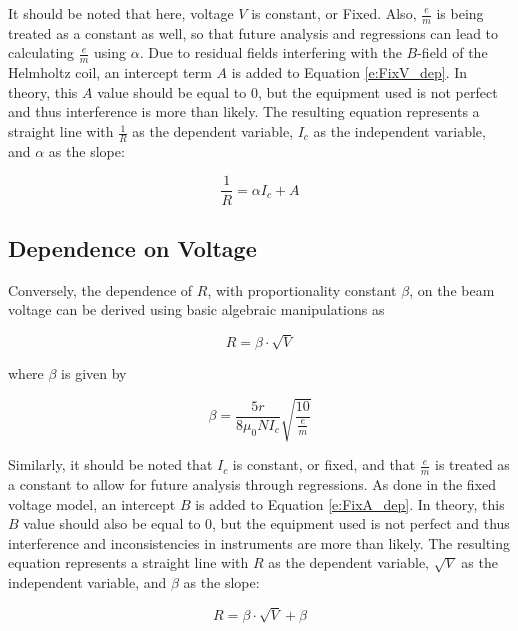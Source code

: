 \documentclass[12pt]{article}
\begin{document}
\noindent It should be noted that here, voltage $V$ is constant, or Fixed. Also, $\frac{e}{m}$ is being treated as a constant as well, so that future analysis and regressions can lead to calculating $\frac{e}{m}$ using $\alpha$. Due to residual fields interfering with the $B$-field of the Helmholtz coil, an intercept term $A$ is added to Equation \ref{e:FixV_dep}. In theory, this $A$ value should be equal to 0, but the equipment used is not perfect and thus interference is more than likely. The resulting equation represents a straight line with $\frac{1}{R}$ as the dependent variable, $I_c$ as the independent variable, and $\alpha$ as the slope:

\begin{equation}
	\frac{1}{R}=\alpha I_c + A \label{e:FixV_linear}
\end{equation}

\subsection{Dependence on Voltage}

Conversely, the dependence of $R$, with proportionality constant $\beta$, on the beam voltage can be derived using basic algebraic manipulations as

\begin{equation}
	R=\beta\cdot\sqrt{V} \label{e:FixA_dep}
\end{equation}

\noindent where $\beta$ is given by

\begin{equation}
	\beta=\frac{5r}{8\mu_0NI_c}\sqrt{\frac{10}{\frac{e}{m}}} \label{e:FixA_beta}
\end{equation}

\noindent Similarly, it should be noted that $I_c$ is constant, or fixed, and that $\frac{e}{m}$ is treated as a constant to allow for future analysis through regressions. As done in the fixed voltage model, an intercept $B$ is added to Equation \ref{e:FixA_dep}. In theory, this $B$ value should also be equal to 0, but the equipment used is not perfect and thus interference and inconsistencies in instruments are more than likely. The resulting equation represents a straight line with $R$ as the dependent variable, $\sqrt{V}$ as the independent variable, and $\beta$ as the slope:

\begin{equation}
	R=\beta\cdot\sqrt{V}+\beta \label{e:FixA_linear}
\end{equation}
\end{document}
